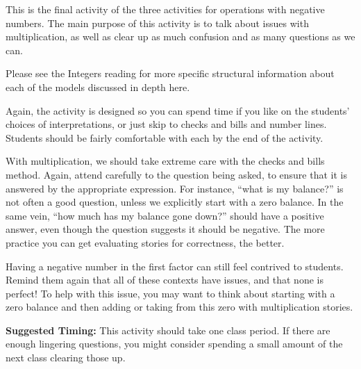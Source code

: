 \documentclass{ximera}
\begin{document}
\newpage
\begin{instructorNotes}
This is the final activity of the three activities for operations with negative numbers.  The main purpose of this activity is to talk about issues with multiplication, as well as clear up as much confusion and as many questions as we can.

Please see the Integers reading for more specific structural information about each of the models discussed in depth here.

Again, the activity is designed so you can spend time if you like on the students' choices of interpretations, or just skip to checks and bills and number lines.  Students should be fairly comfortable with each by the end of the activity.

With multiplication, we should take extreme care with the checks and bills method.  Again, attend carefully to the question being asked, to ensure that it is answered by the appropriate expression.  For instance, ``what is my balance?'' is not often a good question, unless we explicitly start with a zero balance.  In the same vein, ``how much has my balance gone down?'' should have a positive answer, even though the question suggests it should be negative.  The more practice you can get evaluating stories for correctness, the better.

Having a negative number in the first factor can still feel contrived to students.  Remind them again that all of these contexts have issues, and that none is perfect!  To help with this issue, you may want to think about starting with a zero balance and then adding or taking from this zero with multiplication stories.  

{\bf Suggested Timing:} This activity should take one class period.  If there are enough lingering questions, you might consider spending a small amount of the next class clearing those up.
\end{instructorNotes}
\end{document}
